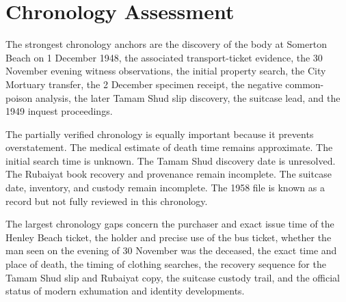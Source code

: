 \begingroup
\scriptsize
\setlength{\tabcolsep}{2pt}
\hfuzz=40pt

\endgroup

\section{Chronology Assessment}

The strongest chronology anchors are the discovery of the body at Somerton Beach on 1 December 1948, the associated transport-ticket evidence, the 30 November evening witness observations, the initial property search, the City Mortuary transfer, the 2 December specimen receipt, the negative common-poison analysis, the later Tamam Shud slip discovery, the suitcase lead, and the 1949 inquest proceedings.

The partially verified chronology is equally important because it prevents overstatement. The medical estimate of death time remains approximate. The initial search time is unknown. The Tamam Shud discovery date is unresolved. The Rubaiyat book recovery and provenance remain incomplete. The suitcase date, inventory, and custody remain incomplete. The 1958 file is known as a record but not fully reviewed in this chronology.

The largest chronology gaps concern the purchaser and exact issue time of the Henley Beach ticket, the holder and precise use of the bus ticket, whether the man seen on the evening of 30 November was the deceased, the exact time and place of death, the timing of clothing searches, the recovery sequence for the Tamam Shud slip and Rubaiyat copy, the suitcase custody trail, and the official status of modern exhumation and identity developments.

